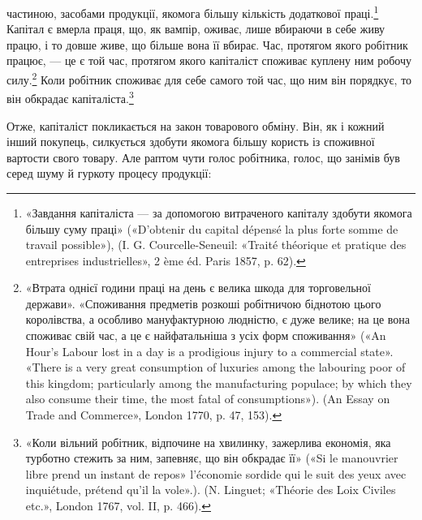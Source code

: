 \parcont{}  %
частиною, засобами продукції, якомога більшу кількість додаткової
праці.\footnote{
«Завдання капіталіста — за допомогою витраченого капіталу здобути
якомога більшу суму праці» («D’obtenir du capital dépensé la
plus forte somme de travail possible»), (I. G. Courcelle-Seneuil: «Traité
théorique et pratique des entreprises industrielles», 2 ème éd. Paris 1857,
p. 62).
} Капітал є вмерла праця, що, як вампір, оживає,
лише вбираючи в себе живу працю, і то довше живе, що більше
вона її вбирає. Час, протягом якого робітник працює, — це є
той час, протягом якого капіталіст споживає куплену ним робочу
силу.\footnote{
«Втрата однієї години праці на день є велика шкода для торговельної
держави». «Споживання предметів розкоші робітничою біднотою цього
королівства, а особливо мануфактурною людністю, є дуже велике; на це
вона споживає свій час, а це є найфатальніша з усіх форм споживання»
(«An Hour’s Labour lost in a day is a prodigious injury to a commercial
state». «There is a very great consumption of luxuries among the labouring
poor of this kingdom; particularly among the manufacturing populace; by
which they also consume their time, the most fatal of consumptions»). (An
Essay on Trade and Commerce», London 1770, p. 47, 153).
} Коли робітник споживає для себе самого той час, що ним
він порядкує, то він обкрадає капіталіста.\footnote{
«Коли вільний робітник, відпочине на хвилинку, зажерлива економія,
яка турботно стежить за ним, запевняє, що він обкрадає її» («Si le
manouvrier libre prend un instant de repos» l’économie sordide qui le suit
des yeux avec inquiétude, prétend qu’il la vole».). (N. Linguet; «Théorie
des Loix Civiles etc.», London 1767, vol. II, p. 466).
}

Отже, капіталіст покликається на закон товарового обміну.
Він, як і кожний інший покупець, силкується здобути якомога
більшу користь із споживної вартости свого товару. Але раптом
чути голос робітника, голос, що занімів був серед шуму й гуркоту
процесу продукції:

